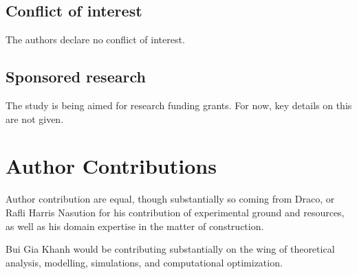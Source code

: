 \documentclass[twocolumn,letterpaper, 12pt]{article}
\begin{document}
\subsection{Conflict of interest}
 The authors declare no conflict of interest.
%
\subsection{Sponsored research}
The study is being aimed for research funding grants. For now, key details on this are not given. 
%
%
%
%
%
\section{Author Contributions}
Author contribution are equal, though substantially so coming from Draco, or Rafli Harris Nasution for his contribution of experimental ground and resources, as well as his domain expertise in the matter of construction. 

Bui Gia Khanh would be contributing substantially on the wing of theoretical analysis, modelling, simulations, and computational optimization. 
\renewcommand\refname{References}
\begin{footnotesize}

\textnormal{}
\end{footnotesize}
\end{document}
